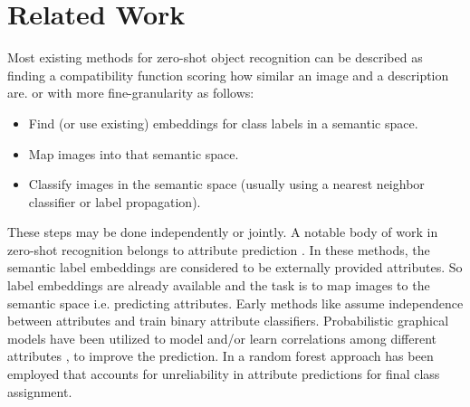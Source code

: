 \documentclass[10pt,twocolumn,letterpaper]{article}
\begin{document}
\section{Related Work} \label{related}
Most existing methods for zero-shot object recognition can be described as finding a compatibility function scoring how
similar an image and a description are.
or with more fine-granularity as follows:
\begin{itemize}
  \item Find (or use existing) embeddings for class labels in a semantic space.
  \item Map images into that semantic space.
  \item Classify images in the semantic space (usually using a nearest neighbor classifier or label propagation).
\end{itemize}
These steps may be done independently or jointly.
A notable body of work in zero-shot recognition belongs to attribute prediction  \cite{lampert09, topicmodel, ajoint11, unified13, suzuki14}.
In these methods, the semantic label embeddings are considered to be externally provided attributes. So label embeddings are
already available and the task is to map images to the semantic space i.e. predicting attributes.
Early methods like \cite{lampert09} assume independence between attributes and train binary attribute classifiers.
Probabilistic graphical models have been utilized to model and/or learn correlations among different attributes \cite{topicmodel, unified13}, to improve the prediction.
In \cite{jayaraman14}  a random forest approach has been employed that accounts for unreliability in attribute predictions
 for final class assignment.

\end{document}
